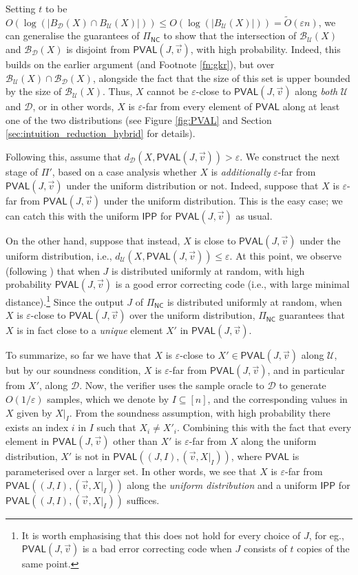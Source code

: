 \documentclass[10pt,a4paper]{article}
\newcommand{\NC}{\mathsf{NC}}
\newcommand{\PVAL}{\mathsf{PVAL}}
\newcommand{\IPP}{\mathsf{IPP}}
\newcommand{\sU}{\mathcal{U}}
\newcommand{\sD}{\mathcal{D}}
\newcommand{\sB}{\mathcal{B}}
\newcommand{\eps}{\varepsilon}
\begin{document}
Setting $t$ to be $O(\log (\vert B_\sD (X) \cap B_\sU (X) \vert)) \leq O(\log(\vert B_\sU (X) \vert)) = \tilde{O}(\varepsilon n)$, we can generalise the guarantees of $\Pi_\NC$ to show that the intersection of $\sB_\sU(X)$ and $\sB_\sD(X)$ is disjoint from $\PVAL(J,\Vec{v})$, with high probability. Indeed, this builds on the earlier argument (and Footnote \ref{fn:gkr}), but over $\sB_\sU(X) \cap \sB_\sD(X)$, alongside the fact that the size of this set is upper bounded by the size of $\sB_\sU(X)$. Thus, $X$ cannot be $\varepsilon$-close to $\PVAL(J,\Vec{v})$ along \textit{both} $\sU$ and $\sD$, or in other words, $X$ is $\eps$-far from every element of $\PVAL$ along at least one of the two distributions (see Figure \ref{fig:PVAL} and Section \ref{sec:intuition_reduction_hybrid} for details).

Following this, assume that $d_\sD (X, \PVAL(J,\Vec{v})) > \varepsilon$. We construct the next stage of $\Pi'$, based on a case analysis whether $X$ is \textit{additionally} $\varepsilon$-far from $\PVAL(J,\Vec{v})$ under the uniform distribution or not. Indeed, suppose that $X$ is $\eps$-far from $\PVAL(J,\vec{v})$ under the uniform distribution. This is the easy case; we can catch this with the uniform $\IPP$ for $\PVAL(J,\Vec{v})$ as usual. 

On the other hand, suppose that instead, $X$ is close to $\PVAL(J,\Vec{v})$ under the uniform distribution, i.e., $d_\sU(X,\PVAL(J,\vec{v})) \leq \eps$. At this point, we observe (following \cite{RR20_batch_polylog}) that when $J$ is distributed uniformly at random, with high probability $\PVAL(J,\Vec{v})$ is a good error correcting code (i.e., with large minimal distance).\footnote{It is worth emphasising that this does not hold for every choice of $J$, for eg., $\PVAL(J,\Vec{v})$ is a bad error correcting code when $J$ consists of $t$ copies of the same point.} Since the output $J$ of $\Pi_\NC$ is distributed uniformly at random, when $X$ is $\varepsilon$-close to $\PVAL(J,\vec{v})$ over the uniform distribution, $\Pi_\NC$ guarantees that $X$ is in fact close to a \textit{unique} element $X'$ in $\PVAL(J,\Vec{v})$. 

To summarize, so far we have that $X$ is $\eps$-close to $X' \in \PVAL(J,\Vec{v})$ along $\sU$, but by our soundness condition, $X$ is $\eps$-far from $\PVAL(J,\Vec{v})$, and in particular from $X'$, along $\sD$. Now, the verifier uses the sample oracle to $\sD$ to generate $O(1/\varepsilon)$ samples, which we denote by $I\subseteq [n]$, and the corresponding values in $X$ given by $X \vert_I$. From the soundness assumption, with high probability there exists an index $i$ in $I$ such that $X_i \neq X'_i$. Combining this with the fact that every element in $\PVAL(J,\Vec{v})$ other than $X'$ is $\varepsilon$-far from $X$ along the uniform distribution, $X'$ is not in $\PVAL((J,I),(\Vec{v},X \vert_I))$, where $\PVAL$ is parameterised over a larger set. In other words, we see that $X$ is $\eps$-far from $\PVAL((J,I),(\Vec{v},X \vert_I))$ along the \textit{uniform distribution} and a uniform $\IPP$ for $\PVAL((J,I),(\Vec{v},X \vert_I))$ suffices.
\end{document}
